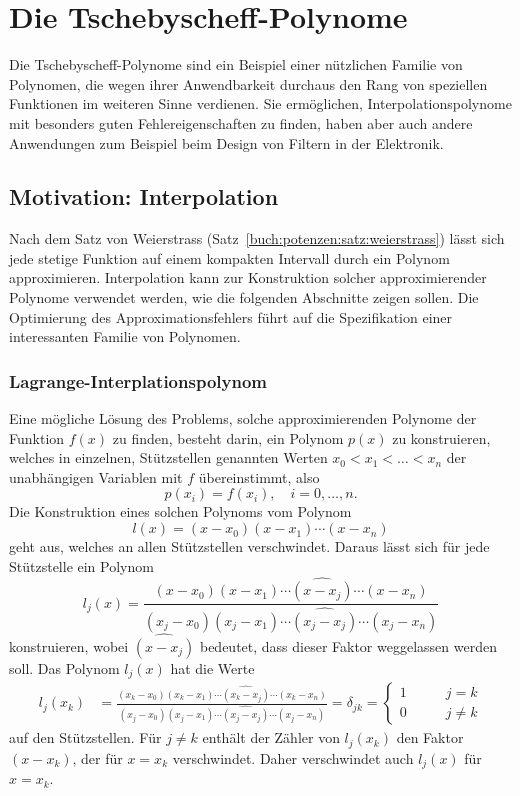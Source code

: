 %
%
%
\section{Die Tschebyscheff-Polynome
\label{buch:polynome:section:tschebyscheff}}
Die Tschebyscheff-Polynome sind ein Beispiel einer nützlichen Familie
von Polynomen, die wegen ihrer Anwendbarkeit durchaus den Rang von
speziellen Funktionen im weiteren Sinne verdienen.
Sie ermöglichen, Interpolationspolynome mit besonders guten
Fehlereigenschaften zu finden, haben aber auch andere Anwendungen
zum Beispiel beim Design von Filtern in der Elektronik.

%
%
\subsection{Motivation: Interpolation}
Nach dem Satz von Weierstrass
(Satz~\ref{buch:potenzen:satz:weierstrass})
lässt sich jede stetige Funktion auf einem kompakten Intervall durch
ein Polynom approximieren.
Interpolation kann zur Konstruktion solcher approximierender Polynome
verwendet werden, wie die folgenden Abschnitte zeigen sollen.
Die Optimierung des Approximationsfehlers führt auf die Spezifikation
einer interessanten Familie von Polynomen.

%
%
\subsubsection{Lagrange-Interplationspolynom}
Eine mögliche Lösung des Problems, solche approximierenden Polynome
der Funktion $f(x)$
zu finden, besteht darin, ein Polynom $p(x)$ zu konstruieren, welches
in einzelnen, Stützstellen genannten Werten $x_0<x_1<\dots<x_n$ der
unabhängigen Variablen mit $f$ übereinstimmt, also
\[
p(x_i) = f(x_i), \quad i=0,\dots,n.
\]
Die Konstruktion eines solchen Polynoms vom Polynom
\[
l(x) = (x-x_0)(x-x_1)\cdots(x-x_n)
\]
geht aus, welches an allen Stützstellen verschwindet.
Daraus lässt sich für jede Stützstelle ein Polynom
\[
l_j(x)
=
\frac{
(x-x_0)(x-x_1)\cdots\widehat{(x-x_j)}\cdots(x-x_n)
}{
(x_j-x_0)(x_j-x_1)\cdots\widehat{(x_j-x_j)}\cdots(x_j-x_n)
}
\]
konstruieren, wobei $\widehat{(x-x_j)}$ bedeutet, dass dieser Faktor
weggelassen werden soll.
Das Polynom $l_j(x)$ hat die Werte
\begin{align}
l_j(x_k)
&=
\frac{
(x_k-x_0)(x_k-x_1)\cdots\widehat{(x_k-x_j)}\cdots(x_k-x_n)
}{
(x_j-x_0)(x_j-x_1)\cdots\widehat{(x_j-x_j)}\cdots(x_j-x_n)
}
=
\delta_{jk}
=
\begin{cases}
1&\qquad j=k\\
0&\qquad j\ne k
\end{cases}
\label{buch:potenzen:interpolation:lj}
\end{align}
auf den Stützstellen.
Für $j\ne k$ enthält der Zähler von $l_j(x_k)$ den Faktor
$(x-x_k)$, der für $x=x_k$ verschwindet.
Daher verschwindet auch $l_j(x)$ für $x=x_k$.

